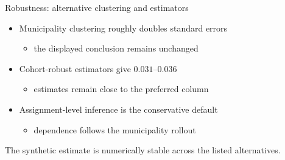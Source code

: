 \documentclass[11pt, aspectratio=169]{beamer}
\begin{document}
\AppendixStart

\begin{frame}{Robustness: alternative clustering and estimators}
  \hypertarget{app:robust}{}%
  \begin{itemize}
    \item Municipality clustering roughly doubles standard errors
      \begin{itemize}\item the displayed conclusion remains unchanged\end{itemize}
    \item Cohort-robust estimators give $0.031$--$0.036$
      \begin{itemize}\item estimates remain close to the preferred column\end{itemize}
    \item Assignment-level inference is the conservative default
      \begin{itemize}\item dependence follows the municipality rollout\end{itemize}
  \end{itemize}
  \begin{ResultBox}
    The synthetic estimate is numerically stable across the listed alternatives.
  \end{ResultBox}
\end{frame}
\end{document}
